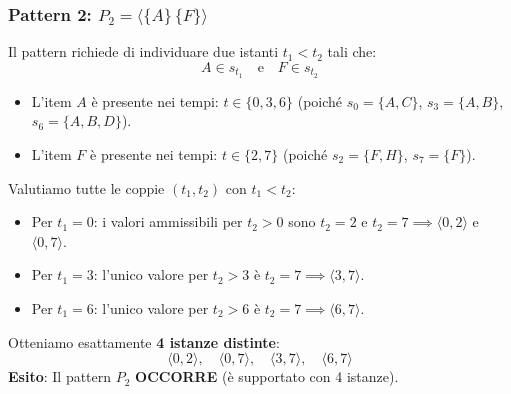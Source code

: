 \subsubsection{Pattern 2: $P_2 = \langle \{A\} \, \{F\} \rangle$}
Il pattern richiede di individuare due istanti $t_1 < t_2$ tali che:
\begin{equation*}
A \in s_{t_1} \quad \text{e} \quad F \in s_{t_2}
\end{equation*}
\begin{itemize}
    \item L'item $A$ è presente nei tempi: $t \in \{0, 3, 6\}$ (poiché $s_0 = \{A, C\}$, $s_3 = \{A, B\}$, $s_6 = \{A, B, D\}$).
    \item L'item $F$ è presente nei tempi: $t \in \{2, 7\}$ (poiché $s_2 = \{F, H\}$, $s_7 = \{F\}$).
\end{itemize}
Valutiamo tutte le coppie $(t_1, t_2)$ con $t_1 < t_2$:
\begin{itemize}
    \item Per $t_1 = 0$: i valori ammissibili per $t_2 > 0$ sono $t_2 = 2$ e $t_2 = 7 \implies \langle 0, 2 \rangle$ e $\langle 0, 7 \rangle$.
    \item Per $t_1 = 3$: l'unico valore per $t_2 > 3$ è $t_2 = 7 \implies \langle 3, 7 \rangle$.
    \item Per $t_1 = 6$: l'unico valore per $t_2 > 6$ è $t_2 = 7 \implies \langle 6, 7 \rangle$.
\end{itemize}
Otteniamo esattamente \textbf{4 istanze distinte}:
\begin{equation}
\langle 0, 2 \rangle, \quad \langle 0, 7 \rangle, \quad \langle 3, 7 \rangle, \quad \langle 6, 7 \rangle
\end{equation}
\textbf{Esito}: Il pattern $P_2$ \textbf{OCCORRE} (è supportato con 4 istanze).

